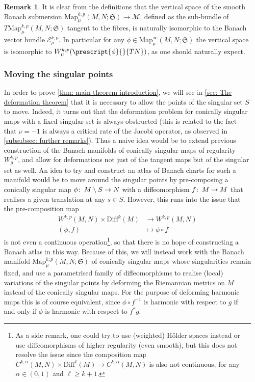 \documentclass{article}
\numberwithin{equation}{section}        %
\theoremstyle{bfnote}
\theoremstyle{definition}
\theoremstyle{bfremark}
\newtheorem{rem}[thm]{Remark}               %
\newcommand{\col}{\colon \thinspace}        %
\newcommand{\Map}{\mathrm{Map}}             %
\begin{document}
\begin{rem}
    It is clear from the definitions that the vertical space of the smooth Banach submersion $\Map^{k,p}_\mu(M,N;\mathfrak{S}) \to \mathcal{M}$, defined as the sub-bundle of $T\Map^{k,p}_\mu(M,N;\mathfrak{S})$ tangent to the fibres, is naturally isomorphic to the Banach vector bundle $\mathcal{E}^{k,p}_\mu$. In particular for any $\phi \in \Map^\infty_\mu(M,N;\mathfrak{S})$ the vertical space is isomorphic to $W^{k,p}_\mu(\prescript{\phi}{}{TN})$, as one should naturally expect.
\end{rem}


    \subsubsection{Moving the singular points}     \label{subsubsec: Moving the singular points}

In order to prove \cref{thm: main theorem introduction}, we will see in \cref{sec: The deformation theorem} that it is necessary to allow the points of the singular set $S$ to move. Indeed, it turns out that the deformation problem for conically singular maps with a fixed singular set is always obstructed (this is related to the fact that $\nu=-1$ is always a critical rate of the Jacobi operator, as observed in \cref{subsubsec: further remarks}). Thus a naive idea would be to extend previous construction of the Banach manifolds of conically singular maps of regularity $W^{k,p}_\mu$, and allow for deformations not just of the tangent maps but of the singular set as well. An idea to try and construct an atlas of Banach charts for such a manifold would be to move around the singular points by pre-composing a conically singular map $\phi \col M\setminus S \to N$ with a diffeomorphism $f \col M \to M$ that realises a given translation at any $s \in S$. However, this runs into the issue that the pre-composition map
\begin{align*}
    W^{k,p}(M,N) \times \mathrm{Diff}^k(M) &\to W^{k,p}(M,N) \\
    (\phi,f) &\mapsto \phi \circ f
\end{align*}
is not even a continuous operation\footnote{As a side remark, one could try to use (weighted) H\"older spaces instead or use diffeomorphisms of higher regularity (even smooth), but this does not resolve the issue since the composition map $C^{k,\alpha}(M,N) \times \mathrm{Diff}^\ell(M) \to C^{k,\alpha}(M,N)$ is also not continuous, for any $\alpha \in (0,1)$ and $\ell \geq k+1$.}, so that there is no hope of constructing a Banach atlas in this way. Because of this, we will instead work with the Banach manifold $\Map^{k,p}_\mu(M,N;\mathfrak{S})$ of conically singular maps whose singularities remain fixed, and use a parametrised family of diffeomorphisms to realise (local) variations of the singular points by deforming the Riemannian metrics on $M$ instead of the conically singular maps. For the purpose of deforming harmonic maps this is of course equivalent, since $\phi \circ f^{-1}$ is harmonic with respect to $g$ if and only if $\phi$ is harmonic with respect to $f^*g$.
\end{document}
